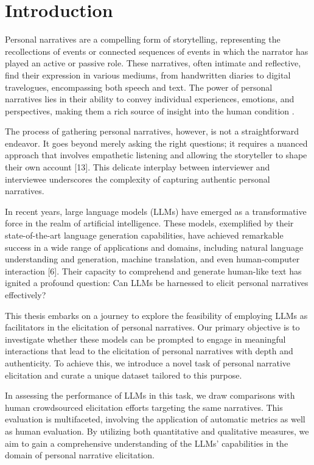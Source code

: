 \chapter{Introduction}
\label{cha:intro}
Personal narratives are a compelling form of storytelling, representing the recollections of events or connected sequences of events in which the narrator has played an active or passive role. These narratives, often intimate and reflective, find their expression in various mediums, from handwritten diaries to digital travelogues, encompassing both speech and text. The power of personal narratives lies in their ability to convey individual experiences, emotions, and perspectives, making them a rich source of insight into the human condition \cite{}. 

The process of gathering personal narratives, however, is not a straightforward endeavor. It goes beyond merely asking the right questions; it requires a nuanced approach that involves empathetic listening and allowing the storyteller to shape their own account [13]. This delicate interplay between interviewer and interviewee underscores the complexity of capturing authentic personal narratives.

In recent years, large language models (LLMs) have emerged as a transformative force in the realm of artificial intelligence. These models, exemplified by their state-of-the-art language generation capabilities, have achieved remarkable success in a wide range of applications and domains, including natural language understanding and generation, machine translation, and even human-computer interaction [6]. Their capacity to comprehend and generate human-like text has ignited a profound question: Can LLMs be harnessed to elicit personal narratives effectively?

This thesis embarks on a journey to explore the feasibility of employing LLMs as facilitators in the elicitation of personal narratives. Our primary objective is to investigate whether these models can be prompted to engage in meaningful interactions that lead to the elicitation of personal narratives with depth and authenticity. To achieve this, we introduce a novel task of personal narrative elicitation and curate a unique dataset tailored to this purpose.

In assessing the performance of LLMs in this task, we draw comparisons with human crowdsourced elicitation efforts targeting the same narratives. This evaluation is multifaceted, involving the application of automatic metrics as well as human evaluation. By utilizing both quantitative and qualitative measures, we aim to gain a comprehensive understanding of the LLMs' capabilities in the domain of personal narrative elicitation.

